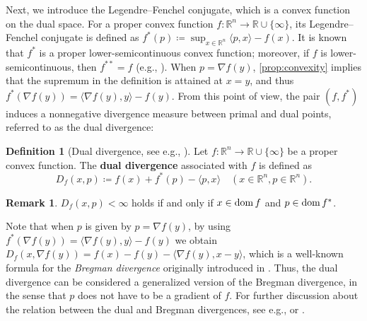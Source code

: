 \documentclass[11pt,a4paper]{article}
\theoremstyle{definition}
\newtheorem{dfn}{Definition}[section]
\newtheorem{rem}{Remark}[section]
\theoremstyle{plain}
\newcommand{\RR}{{\mathbb{R}}}
\newcommand{\dom}{\mathop{\rm dom}}
\begin{document}
Next, we introduce the Legendre--Fenchel conjugate, which is a convex function on the dual space.
For a proper convex function $f: \RR^n \to \RR \cup \{\infty\}$, its Legendre--Fenchel conjugate is defined as $f^\ast(p) \coloneqq \sup_{x \in \RR^n}\langle p, x\rangle - f(x)$.
It is known that $f^\ast$ is a proper lower-semicontinuous convex function; moreover, if $f$ is lower-semicontinuous, then $f^{\ast\ast} = f$ (e.g., \cite[Theorem~E.1.3.5]{HL2001}).
When $p = \nabla f(y)$, \cref{prop:convexity} implies that the supremum in the definition is attained at $x = y$, and thus $f^\ast(\nabla f(y)) = \langle\nabla f(y), y\rangle - f(y)$.
From this point of view, the pair $(f, f^\ast)$ induces a nonnegative divergence measure between primal and dual points, referred to as the dual divergence:
\begin{dfn}[Dual divergence, see e.g., {\cite[Appendix~A]{BMDG2005}}]
    \label{dfn:divergence}
    Let $f: \RR^n \to \RR \cup \{\infty\}$ be a proper convex function.
    The \textbf{dual divergence} associated with $f$ is defined as
    \[
        D_{f}(x, p) \coloneqq f(x) + f^\ast(p) - \langle p, x\rangle \quad (x \in \RR^n, p \in \RR^n).
    \]
\end{dfn}
\begin{rem}
    $D_{f}(x, p) < \infty$ holds if and only if $x \in \dom f$ and $p \in \dom f^\ast$.
\end{rem}
Note that when $p$ is given by $p = \nabla f(y)$, by using $f^\ast(\nabla f(y)) = \langle \nabla f(y), y\rangle - f(y)$ we obtain $D_f(x, \nabla f(y)) = f(x) - f(y) - \langle\nabla f(y), x - y\rangle$, which is a well-known formula for the \textit{Bregman divergence} originally introduced in \cite[Equation~(1.4)]{Bregman1967}.
Thus, the dual divergence can be considered a generalized version of the Bregman divergence, in the sense that $p$ does not have to be a gradient of $f$.
For further discussion about the relation between the dual and Bregman divergences, see e.g., \cite[Chapter~1]{Amari2016} or \cite[Appendix~A]{BMDG2005}.
\end{document}
